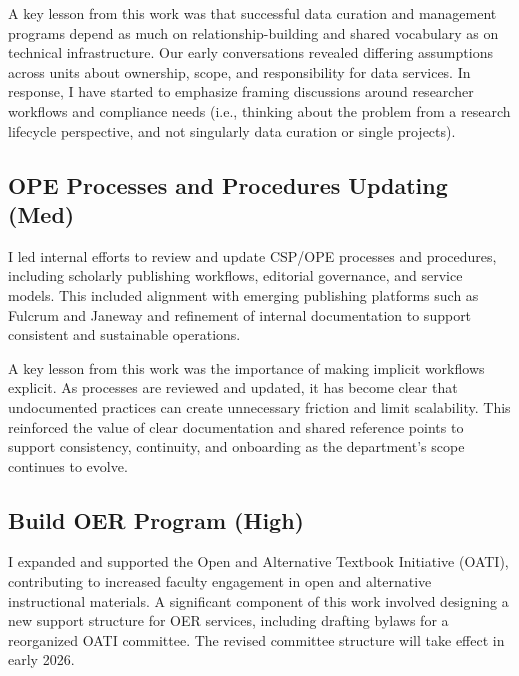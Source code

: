 \vspace{\baselineskip}

A key lesson from this work was that successful data curation and management programs depend as much on relationship-building and shared vocabulary as on technical infrastructure. Our early conversations revealed differing assumptions across units about ownership, scope, and responsibility for data services. In response, I have started to emphasize framing discussions around researcher workflows and compliance needs (i.e., thinking about the problem from a research lifecycle perspective, and not singularly data curation or single projects). 

\vspace{\baselineskip}

\subsection*{OPE Processes and Procedures Updating (Med)}

I led internal efforts to review and update CSP/OPE processes and procedures, including scholarly publishing workflows, editorial governance, and service models. This included alignment with emerging publishing platforms such as Fulcrum and Janeway and refinement of internal documentation to support consistent and sustainable operations.

\vspace{\baselineskip}

A key lesson from this work was the importance of making implicit workflows explicit. As processes are reviewed and updated, it has become clear that undocumented practices can create unnecessary friction and limit scalability. This reinforced the value of clear documentation and shared reference points to support consistency, continuity, and onboarding as the department’s scope continues to evolve.

\vspace{\baselineskip}

\subsection*{Build OER Program (High)}

I expanded and supported the Open and Alternative Textbook Initiative (OATI), contributing to increased faculty engagement in open and alternative instructional materials. A significant component of this work involved designing a new support structure for OER services, including drafting bylaws for a reorganized OATI committee. The revised committee structure will take effect in early 2026.

